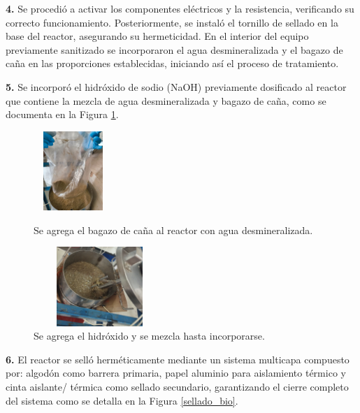 \documentclass[12pt]{article}
\begin{document}
			\textbf{4.} Se procedió a activar los componentes eléctricos y la resistencia, verificando su correcto funcionamiento. Posteriormente, se instaló el tornillo de sellado en la base del reactor, asegurando su hermeticidad. En el interior del equipo previamente sanitizado se incorporaron el agua desmineralizada y el bagazo de caña en las proporciones establecidas, iniciando así el proceso de tratamiento. 
			
			\textbf{5.} Se incorporó el hidróxido de sodio (NaOH) previamente dosificado al reactor que contiene la mezcla de agua desmineralizada y bagazo de caña,  como se documenta en la Figura \ref{bagazo con hidroxido}.
			
			
			\begin{figure}[H]
				\centering
				\begin{minipage}{0.46\textwidth}
					\centering
					\includegraphics[width=3cm, height=3cm]{imagenes/agua con bagazo}
					\caption{Se agrega el bagazo de caña al reactor con agua desmineralizada.}
					\label{agua con bagazo}
				\end{minipage}
				\hfill
				\begin{minipage}{0.48\textwidth}
					\centering
					\includegraphics[width=5cm, height=3cm]{imagenes/bagazo con hidroxido1}
					\caption{Se agrega el hidróxido y se mezcla hasta incorporarse.}
					\label{bagazo con hidroxido}
				\end{minipage}
			\end{figure}
			
			
			\textbf{6.} El reactor se selló herméticamente mediante un sistema multicapa compuesto por: algodón como barrera primaria, papel aluminio para aislamiento térmico y cinta aislante/ térmica como sellado secundario, garantizando el cierre completo del sistema como se detalla en la Figura \ref{sellado_bio}.
			
			
			
\end{document}
